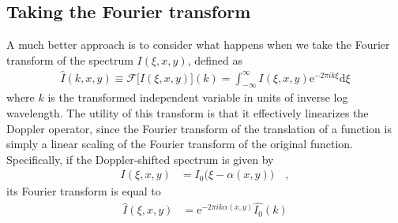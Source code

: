 \documentclass[modern]{aastex62}
\begin{document}
\subsection{Taking the Fourier transform}
\label{sec:fourier}

A much better approach is to consider what happens when we take the
Fourier transform of the spectrum $I(\xi, x, y)$, defined as
%
\begin{align}
    \label{eq:FT}
    \hat{I}(k, x, y)
    \equiv
    \mathcal{F}\Big[I(\xi, x, y)\Big](k) 
    =
    \int_{-\infty}^\infty
        I(\xi, x, y)
        \mathrm{e}^{-2\pi i k \xi} \mathrm{d}\xi
\end{align}
%
where $k$ is the transformed independent variable in units 
of inverse log wavelength. The utility of this transform is
that it effectively linearizes the Doppler operator, since
the Fourier transform of the translation of a function is
simply a linear scaling of the Fourier transform of the
original function. Specifically, if the Doppler-shifted spectrum 
is given by
%
\begin{align}
    I(\xi, x, y) &= I_0\big(\xi - \alpha(x, y)\big) \quad,
\end{align}
%
its Fourier transform is equal to
%
\begin{align}
    \hat{I}(\xi, x, y) &= \mathrm{e}^{-2\pi i k \alpha(x, y)}\hat{I_0}(k)
\end{align}
%


\end{document}
